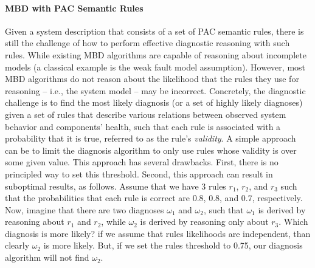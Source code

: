 \documentclass[12pt]{article}
\newcommand{\note}[1]{\textbf{\textit{#1}}}
\begin{document}


\paragraph{MBD with PAC Semantic Rules}
Given a system description that consists of a set of PAC semantic rules, there is still the challenge 
of how to perform effective diagnostic reasoning with such rules. 
While existing MBD algorithms are capable of reasoning about incomplete models (a classical example is the weak fault model assumption). However, most MBD algorithms do not reason about the likelihood that the rules they use for reasoning -- i.e., the system model -- may be incorrect. 
Concretely, the diagnostic challenge is to find the most likely diagnosis (or a set of highly likely diagnoses) given a set of rules that describe various relations between observed system behavior and components' health, such that each rule is associated with a probability that it is true, referred to as the rule's {\em validity}. 
A simple approach can be to limit the diagnosis algorithm to only use rules whose validity is over some given value. This approach has several drawbacks. First, there is no principled way to set this threshold. Second, this approach can result in suboptimal results, as follows. 
Assume that we have 3 rules $r_1$, $r_2$, and $r_3$ such that the probabilities that each rule is correct are 0.8, 0.8, and 0.7, respectively. 
Now, imagine that there are two diagnoses $\omega_1$ and $\omega_2$, such that $\omega_1$ is derived by reasoning about $r_1$ and $r_2$, while $\omega_2$ is derived by reasoning only about $r_3$. Which diagnosis is more likely? 
if we assume that rules likelihoods are independent, than clearly $\omega_2$ is more likely. But, if we set the rules threshold to 0.75, our diagnosis algorithm will not find $\omega_2$. 
\end{document}
